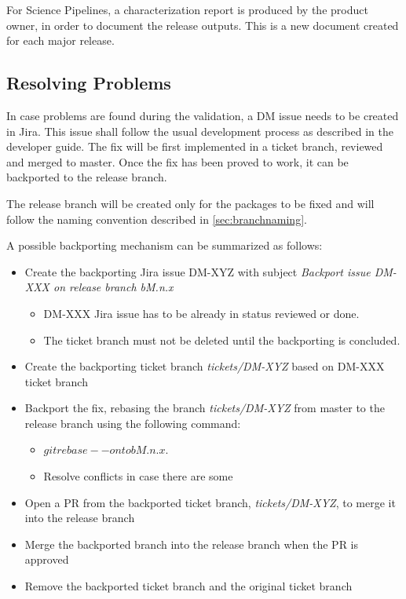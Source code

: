 For Science Pipelines, a characterization report is produced by the product owner, in order to document the release outputs.
This is a new document created for each major release.


\subsection{Resolving Problems}

In case problems are found during the validation, a DM issue needs to be created in Jira.
This issue shall follow the usual development process as described in the developer guide.
The fix will be first implemented in a ticket branch, reviewed and merged to master.
Once the fix has been proved to work, it can be backported to the release branch.

The release branch will be created only for the packages to be fixed and will follow the naming convention described in \ref{sec:branchnaming}.

A possible backporting mechanism can be summarized as follows:

\begin{itemize}
\item Create the backporting Jira issue DM-XYZ with subject \textit{Backport issue DM-XXX on release branch bM.n.x}
  \begin{itemize}
  \item DM-XXX Jira issue has to be already in status reviewed or done.
  \item The ticket branch must not be deleted until the backporting is concluded.
  \end{itemize}
\item Create the backporting ticket branch \textit{tickets/DM-XYZ}  based on DM-XXX ticket branch
\item Backport the fix, rebasing the branch \textit{tickets/DM-XYZ} from master to the release branch using the following command:
  \begin{itemize}
   \item $git rebase --onto bM.n.x$.
   \item Resolve conflicts in case there are some
  \end{itemize}
\item Open a PR from the backported ticket branch, \textit{tickets/DM-XYZ}, to merge it into the release branch
\item Merge the backported branch into the release branch when the PR is approved
\item Remove the backported ticket branch and the original ticket branch
\end{itemize}

